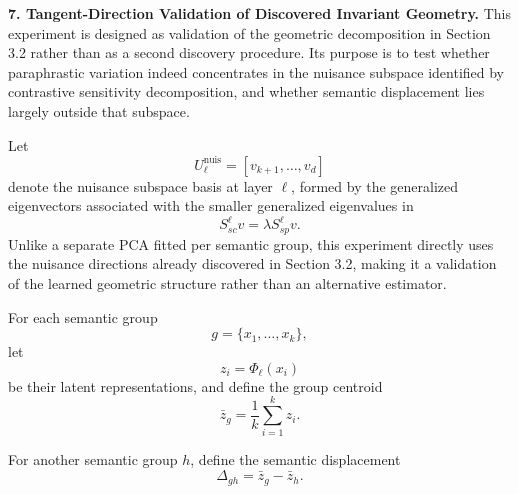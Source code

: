 




\noindent \textbf{7. Tangent-Direction Validation of Discovered Invariant Geometry.}
This experiment is designed as validation of the geometric decomposition in Section 3.2 rather than as a second discovery procedure. Its purpose is to test whether paraphrastic variation indeed concentrates in the nuisance subspace identified by contrastive sensitivity decomposition, and whether semantic displacement lies largely outside that subspace.

Let
\[
U_\ell^{\mathrm{nuis}}
=
[v_{k+1},\ldots,v_d]
\]
denote the nuisance subspace basis at layer $\ell$, formed by the generalized eigenvectors associated with the smaller generalized eigenvalues in
\[
S_{sc}^{\ell} v = \lambda S_{sp}^{\ell} v.
\]
Unlike a separate PCA fitted per semantic group, this experiment directly uses the nuisance directions already discovered in Section 3.2, making it a validation of the learned geometric structure rather than an alternative estimator.

For each semantic group
\[
g=\{x_1,\ldots,x_k\},
\]
let
\[
z_i=\Phi_\ell(x_i)
\]
be their latent representations, and define the group centroid
\[
\bar z_g
=
\frac1k
\sum_{i=1}^k z_i.
\]

For another semantic group \(h\), define the semantic displacement
\[
\Delta_{gh}
=
\bar z_g-\bar z_h.
\]

